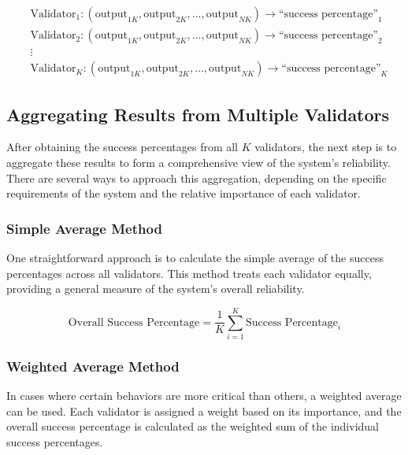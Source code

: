 \documentclass{article}
\begin{document}
\begin{equation*}
\begin{aligned}
&\text{Validator}_1: (\text{output}_{1K}, \text{output}_{2K}, \ldots, \text{output}_{NK}) \rightarrow \text{``success percentage''}_1 \\
&\text{Validator}_2: (\text{output}_{1K}, \text{output}_{2K}, \ldots, \text{output}_{NK}) \rightarrow \text{``success percentage''}_2 \\
&\vdots \\
&\text{Validator}_K: (\text{output}_{1K}, \text{output}_{2K}, \ldots, \text{output}_{NK}) \rightarrow \text{``success percentage''}_K
\end{aligned}
\end{equation*}

\subsection{Aggregating Results from Multiple Validators}

After obtaining the success percentages from all \( K \) validators, the next step is to aggregate these results to form a comprehensive view of the system's reliability. There are several ways to approach this aggregation, depending on the specific requirements of the system and the relative importance of each validator.

\subsubsection{Simple Average Method}
One straightforward approach is to calculate the simple average of the success percentages across all validators. This method treats each validator equally, providing a general measure of the system’s overall reliability.

\begin{equation*}
\text{Overall Success Percentage} = \frac{1}{K} \sum_{i=1}^{K} \text{Success Percentage}_i
\end{equation*}

\subsubsection{Weighted Average Method}

In cases where certain behaviors are more critical than others, a weighted average can be used. Each validator is assigned a weight based on its importance, and the overall success percentage is calculated as the weighted sum of the individual success percentages.
\end{document}
